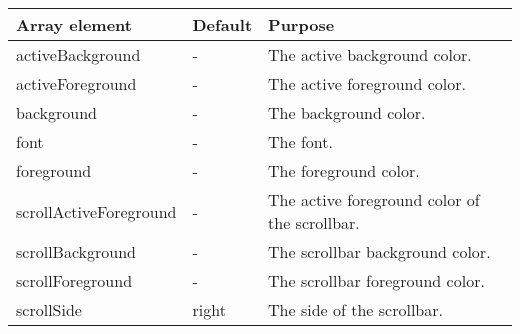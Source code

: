 {\newpage
\clearpage
\samepage \begin{tabular}{|l|l|p{5.5cm}|} \hline
Array element          & Default & Purpose\\  \hline
activeBackground       & -       & The active background
                                   color.\\  \hline
activeForeground       & -       & The active foreground
                                   color.\\  \hline
background             & -       & The background color.\\  \hline
font                   & -       & The font.\\  \hline
foreground             & -       & The foreground color.\\  \hline
scrollActiveForeground & -       & The active foreground
                                   color of the scrollbar.\\  \hline
scrollBackground       & -       & The scrollbar background
                                   color.\\  \hline
scrollForeground       & -       & The scrollbar foreground
                                   color.\\  \hline
scrollSide             & right   & The side of the scrollbar.\\  \hline
\end{tabular}
}

{\newpage
\clearpage
\samepage \begin{figure}[ht]
  \centerline{
  \epsfysize=6.3cm
  }

  \label{fig:CursorBox}
\end{figure}
}

